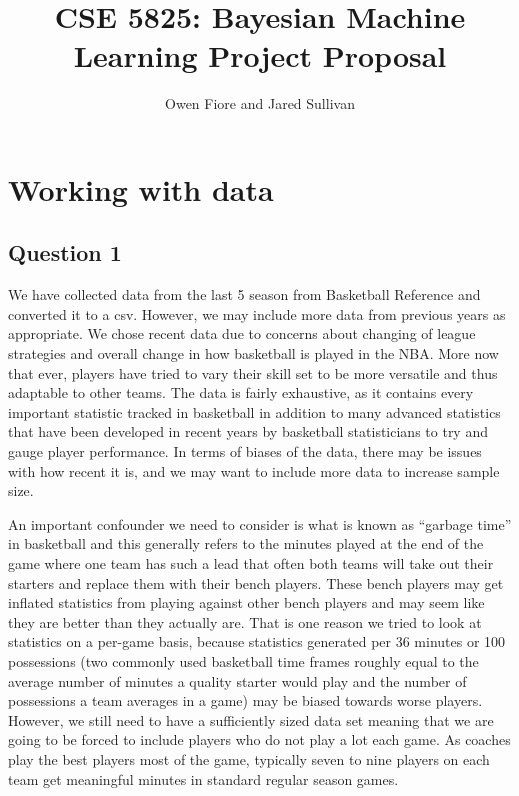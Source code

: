 \documentclass[12pt, letterpaper, titlepage]{article}
\title{CSE 5825: Bayesian Machine Learning Project Proposal}
\author{Owen Fiore and Jared Sullivan}
\begin{document}
\maketitle

\section{Working with data}
\subsection{Question 1}
We have collected data from the last 5 season from Basketball Reference and converted it to a csv. However, we may include more data from previous years as appropriate.  We chose recent data due to concerns about changing of league strategies and overall change
in how basketball is played in the NBA.  More now that ever, players have tried
to vary their skill set to be more versatile and thus adaptable to other teams.
The data is fairly exhaustive, as it contains every important statistic tracked
in basketball in addition to many advanced statistics that have been developed
in recent years by basketball statisticians to try and gauge player performance.
In terms of biases of the data, there may be issues with how recent it is, and
we may want to include more data to increase sample size. 


An important confounder we need to consider is what is known as “garbage time”
in basketball and this generally refers to the minutes played at the end of the game where one team has such a lead that often both teams will take out their starters
and replace them with their bench players.  These bench players may get
inflated statistics from playing against other bench players and may seem
like they are better than they actually are.  That is one reason we tried to
look at statistics on a per-game basis, because statistics generated per
36 minutes or 100 possessions (two commonly used basketball time
frames roughly equal to the average number of minutes a quality starter
would play and the number of possessions a team averages in a game)
may be biased towards worse players. However, we still need to have a
sufficiently sized data set meaning that we are going to be forced to include
players who do not play a lot each game.  As coaches play the best players
most of the game, typically seven to nine players on each team get meaningful minutes
in standard regular season games.
\end{document}
